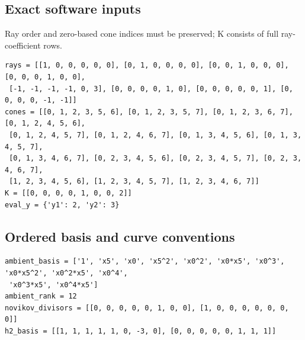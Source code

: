 \documentclass[10pt,a4paper]{article}
\begin{document}
\subsection*{Exact software inputs}
Ray order and zero-based cone indices must be preserved; K consists of full ray-coefficient rows.
\begin{lstlisting}
rays = [[1, 0, 0, 0, 0, 0], [0, 1, 0, 0, 0, 0], [0, 0, 1, 0, 0, 0], [0, 0, 0, 1, 0, 0],
 [-1, -1, -1, -1, 0, 3], [0, 0, 0, 0, 1, 0], [0, 0, 0, 0, 0, 1], [0, 0, 0, 0, -1, -1]]
cones = [[0, 1, 2, 3, 5, 6], [0, 1, 2, 3, 5, 7], [0, 1, 2, 3, 6, 7], [0, 1, 2, 4, 5, 6],
 [0, 1, 2, 4, 5, 7], [0, 1, 2, 4, 6, 7], [0, 1, 3, 4, 5, 6], [0, 1, 3, 4, 5, 7],
 [0, 1, 3, 4, 6, 7], [0, 2, 3, 4, 5, 6], [0, 2, 3, 4, 5, 7], [0, 2, 3, 4, 6, 7],
 [1, 2, 3, 4, 5, 6], [1, 2, 3, 4, 5, 7], [1, 2, 3, 4, 6, 7]]
K = [[0, 0, 0, 0, 1, 0, 0, 2]]
eval_y = {'y1': 2, 'y2': 3}
\end{lstlisting}
\subsection*{Ordered basis and curve conventions}
\begin{lstlisting}
ambient_basis = ['1', 'x5', 'x0', 'x5^2', 'x0^2', 'x0*x5', 'x0^3', 'x0*x5^2', 'x0^2*x5', 'x0^4',
 'x0^3*x5', 'x0^4*x5']
ambient_rank = 12
novikov_divisors = [[0, 0, 0, 0, 0, 1, 0, 0], [1, 0, 0, 0, 0, 0, 0, 0]]
h2_basis = [[1, 1, 1, 1, 1, 0, -3, 0], [0, 0, 0, 0, 0, 1, 1, 1]]
\end{lstlisting}
\end{document}
